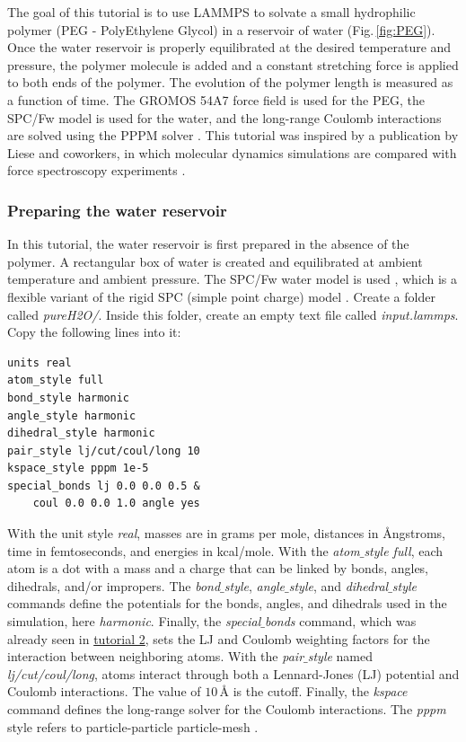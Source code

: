 \documentclass[9pt,tutorial]{livecoms}
\begin{document}
\noindent The goal of this tutorial is to use LAMMPS to solvate a small hydrophilic polymer (PEG - PolyEthylene Glycol) in a reservoir of water (Fig.\,\ref{fig:PEG}). Once the water reservoir is properly equilibrated at the desired temperature and pressure, the polymer molecule is added and a constant stretching force is applied to both ends of the polymer. The evolution of the polymer length is measured as a function of time. The GROMOS 54A7 force field \cite{schmid2011definition} is used for the PEG, the SPC/Fw model \cite{wu2006flexible} is used for the water, and the long-range Coulomb interactions are solved using the PPPM solver \cite{luty1996calculating}. This tutorial was inspired by a publication by Liese and coworkers, in which molecular dynamics simulations are compared with force spectroscopy experiments \cite{liese2017hydration}.

\subsubsection{Preparing the water reservoir}

In this tutorial, the water reservoir is first prepared in the absence of the polymer. A rectangular box of water is created and equilibrated at ambient temperature and ambient pressure. The SPC/Fw water model is used \cite{wu2006flexible}, which is
a flexible variant of the rigid SPC (simple point charge) model \cite{berendsen1981interaction}. Create a folder called \textit{pureH2O/}. Inside this folder, create an empty text file called \textit{input.lammps}. Copy the following lines into it:
{\normalsize \begin{verbatim}
units real
atom_style full
bond_style harmonic
angle_style harmonic
dihedral_style harmonic
pair_style lj/cut/coul/long 10
kspace_style pppm 1e-5
special_bonds lj 0.0 0.0 0.5 &
    coul 0.0 0.0 1.0 angle yes
\end{verbatim}}
With the unit style \textit{real}, masses are in grams per mole, distances in Ångstroms, time in femtoseconds, and energies
in kcal/mole. With the \textit{atom$\_$style full}, each atom is a dot with a mass and a charge that can be linked by bonds, angles, dihedrals, and/or impropers. The \textit{bond$\_$style}, \textit{angle$\_$style}, and \textit{dihedral$\_$style} commands define the potentials for the bonds, angles, and dihedrals used in the simulation, here \textit{harmonic}. Finally, the \textit{special$\_$bonds} command, which was already seen in \hyperref[carbon-nanotube-label]{tutorial 2}, sets the LJ and Coulomb weighting factors for the interaction between neighboring atoms. With the \textit{pair$\_$style} named \textit{lj/cut/coul/long}, atoms interact through both a Lennard-Jones (LJ) potential and Coulomb interactions. The value of $10\,\text{\AA{}}$ is the cutoff. Finally, the \textit{kspace} command defines the long-range solver for the Coulomb interactions. The \textit{pppm} style refers to particle-particle particle-mesh \cite{luty1996calculating}.
\end{document}
